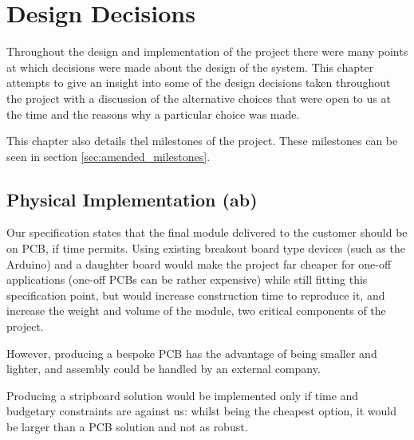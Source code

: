 
\chapter{Design Decisions}
Throughout the design and implementation of the project there were many points
at which decisions were made about the design of the system. This chapter attempts
to give an insight into some of the design decisions taken throughout the project with
a discussion of the alternative choices that were open to us at the time and the reasons
why a particular choice was made.

This chapter also details thel milestones of the project. These milestones can be seen in section \ref{sec:amended_milestones}.












\section{Physical Implementation (ab)}

Our specification states that the final module delivered to the customer 
should be on PCB, if time permits. Using existing breakout board type devices 
(such as the Arduino) and a daughter board would make the project far cheaper for 
one-off applications (one-off PCBs can be rather expensive) while still fitting 
this specification point, 
but would increase construction time to reproduce it, and increase the weight 
and volume of the module, two critical components of the project.

However, producing a bespoke PCB has the advantage of being smaller 
and lighter, and assembly could be handled by an external company.

Producing a stripboard solution would be implemented only if time and budgetary constraints are against us: 
whilst being the cheapest option, it would be larger than a PCB solution and not as robust.
	
